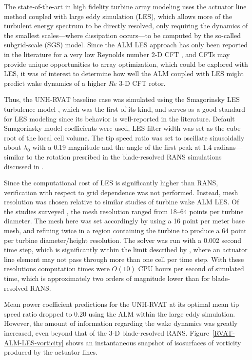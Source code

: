 \documentclass[times]{weauth}
\begin{document}
The state-of-the-art in high fidelity turbine array modeling uses the actuator
line method coupled with large eddy simulation (LES), which allows more of the
turbulent energy spectrum to be directly resolved, only requiring the dynamics
of the smallest scales---where dissipation occurs---to be computed by the
so-called subgrid-scale (SGS) model. Since the ALM LES approach has only been
reported in the literature for a very low Reynolds number 2-D CFT
\cite{Shamsoddin2014}, and CFTs may provide unique opportunities to array
optimization, which could be explored with LES, it was of interest to determine
how well the ALM coupled with LES might predict wake dynamics of a higher $Re$
3-D CFT rotor.

Thus, the UNH-RVAT baseline case was simulated using the Smagorinsky LES
turbulence model \cite{Smagorinsky1963}, which was the first of its kind, and
serves as a good standard for LES modeling since its behavior is well-reported
in the literature. Default Smagorinsky model coefficients were used, LES filter
width was set as the cube root of the local cell volume. The tip speed ratio was
set to oscillate sinusoidally about $\lambda_0$ with a 0.19 magnitude and the
angle of the first peak at 1.4 radians---similar to the rotation presribed in
the blade-resolved RANS simulations discussed in \cite{Bachant2016-BR-CFD}.

Since the computational cost of LES is significantly higher than RANS,
verification with respect to grid dependence was not performed. Instead, mesh
resolution was chosen relative to similar studies of turbine wake ALM LES. Of
the studies surveyed
\cite{Shamsoddin2014,Archer2013,Martinez-Tossas2015a,Troldborg2007}, the mesh
resolution ranged from 18--64 points per turbine diameter. The mesh here was set
accordingly by using a 16 point per meter base mesh, and refining twice in a
region containing the turbine to produce a 64 point per turbine diameter/height
resolution. The solver was run with a 0.002 second time step, which is
significantly within the limit described by \cite{Martinez-Tossas2015}, where an
actuator line element may not pass through more than one cell per time step.
With these resolutions computation times were $O(10)$ CPU hours per second of
simulated time, which is approximately two orders of magnitude lower than for
blade-resolved RANS.

Mean power coefficient predictions for the UNH-RVAT at its optimal mean tip
speed ratio dropped to 0.20 using the ALM within the large eddy simulation.
However, the amount of information regarding the wake dynamics was greatly
increased, even beyond that of the 3-D blade-resolved RANS.
Figure~\ref{RVAT-ALM-LES-vorticity} shows an instantaneous snapshot of
isosurfaces of vorticity produced by the actuator lines.
\end{document}
